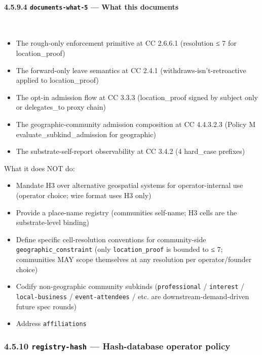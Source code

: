 \documentclass[11pt]{article}
\begin{document}
\paragraph{4.5.9.4 \texttt{documents-what-5} — What this documents}\mbox{}\\


\begin{itemize}\setlength\itemsep{0pt}
\item The rough-only enforcement primitive at CC 2.6.6.1 (resolution ≤ 7 for location\_proof)
\item The forward-only leave semantics at CC 2.4.1 (withdraws-isn't-retroactive applied to location\_proof)
\item The opt-in admission flow at CC 3.3.3 (location\_proof signed by subject only or delegates\_to proxy chain)
\item The geographic-community admission composition at CC 4.4.3.2.3 (Policy M evaluate\_subkind\_admission for geographic)
\item The substrate-self-report observability at CC 3.4.2 (4 hard\_case prefixes)
\end{itemize}


What it does NOT do:

\begin{itemize}\setlength\itemsep{0pt}
\item Mandate H3 over alternative geospatial systems for operator-internal use (operator choice; wire format uses H3 only)
\item Provide a place-name registry (communities self-name; H3 cells are the substrate-level binding)
\item Define specific cell-resolution conventions for community-side \texttt{geographic\_constraint} (only \texttt{location\_proof} is bounded to ≤ 7; communities MAY scope themselves at any resolution per operator/founder choice)
\item Codify non-geographic community subkinds (\texttt{professional} / \texttt{interest} / \texttt{local-business} / \texttt{event-attendees} / etc. are downstream-demand-driven future spec rounds)
\item Address \texttt{affiliations}
\end{itemize}


\subsubsection*{4.5.10 \texttt{registry-hash} — Hash-database operator policy}
\end{document}

